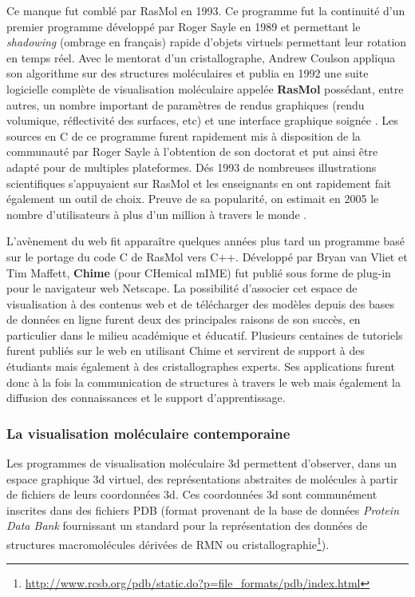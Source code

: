 Ce manque fut comblé par RasMol en 1993. Ce programme fut la continuité d'un premier programme développé par Roger Sayle en 1989 et permettant le \textit{shadowing} (ombrage en français) rapide d'objets virtuels permettant leur rotation en temps réel. 
Avec le mentorat d'un cristallographe, Andrew Coulson appliqua son algorithme sur des structures moléculaires et publia en 1992 une suite logicielle complète de visualisation moléculaire appelée \textbf{RasMol} possédant, entre autres, un nombre important de paramètres de rendus graphiques (rendu volumique, réflectivité des surfaces, etc) et une interface graphique soignée \cite{sayle1992rasmol}. Les sources en C de ce programme furent rapidement mis à disposition de la communauté par Roger Sayle à l'obtention de son doctorat et put ainsi être adapté pour de multiples plateformes. Dés 1993 de nombreuses illustrations scientifiques s'appuyaient sur RasMol et les enseignants en ont rapidement fait également un outil de choix. Preuve de sa popularité, on estimait en 2005 le nombre d'utilisateurs à plus d'un million à travers le monde \cite{martz2004history}.

L'avènement du web fit apparaître quelques années plus tard un programme basé sur le portage du code C de RasMol vers C++. Développé par Bryan van Vliet et Tim Maffett, \textbf{Chime} (pour CHemical mIME) fut publié sous forme de plug-in pour le navigateur web Netscape. La possibilité d'associer cet espace de visualisation à des contenus web et de télécharger des modèles depuis des bases de données en ligne furent deux des principales raisons de son succès, en particulier dans le milieu académique et éducatif. Plusieurs centaines de tutoriels furent publiés sur le web en utilisant Chime et servirent de support à des étudiants mais également à des cristallographes experts. Ses applications furent donc à la fois la communication de structures à travers le web mais également la diffusion des connaissances et le support d'apprentissage.


\subsubsection{La visualisation moléculaire contemporaine}

Les programmes de visualisation moléculaire 3d permettent d'observer, dans un espace graphique 3d virtuel, des représentations abstraites de molécules à partir de fichiers de leurs coordonnées 3d. Ces coordonnées 3d sont communément inscrites dans des fichiers PDB (format provenant de la base de données \textit{Protein Data Bank} fournissant un standard pour la représentation des données de structures macromolécules dérivées de RMN ou cristallographie\footnote{\url{http://www.rcsb.org/pdb/static.do?p=file_formats/pdb/index.html}}).

